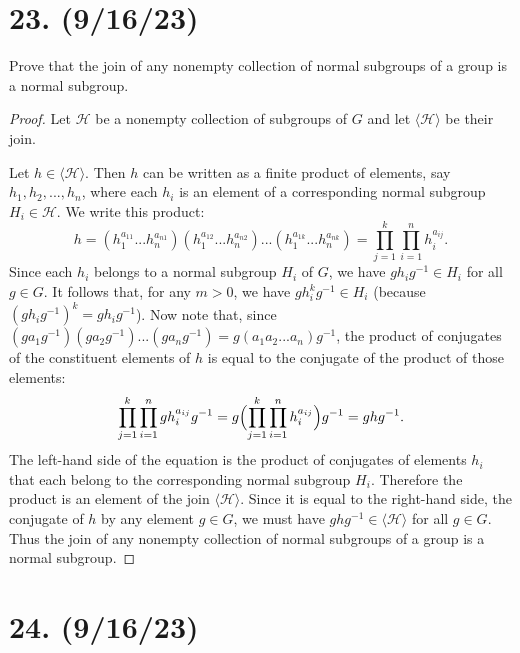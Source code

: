 \documentclass{article}
\begin{document}
\section*{23. (9/16/23)}

Prove that the join of any nonempty collection of normal subgroups of a group is a normal subgroup.

\begin{proof}
    Let $\mathcal{H}$ be a nonempty collection of subgroups of $G$ and let $\langle \mathcal{H} \rangle$ be their join.

    Let $h \in \langle \mathcal{H} \rangle$. Then $h$ can be written as a finite product of elements, say $h_1, h_2, ..., h_n$, where each $h_i$ is an element of a corresponding normal subgroup $H_i \in \mathcal{H}$. We write this product:
    \begin{equation*}
        h = (h_1^{a_{11}}...h_n^{a_{n1}})(h_1^{a_{12}}...h_n^{a_{n2}})...(h_1^{a_{1k}}...h_n^{a_{nk}}) = \prod_{j = 1}^{k} \prod_{i = 1}^{n} h_i^{a_{ij}}.
    \end{equation*}
    Since each $h_i$ belongs to a normal subgroup $H_i$ of $G$, we have $gh_ig^{-1} \in H_i$ for all $g \in G$. It follows that, for any $m > 0$, we have $gh_i^kg^{-1} \in H_i$ (because $(gh_ig^{-1})^k = gh_ig^{-1}$). Now note that, since $(ga_1g^{-1})(ga_2g^{-1})...(ga_ng^{-1}) = g(a_1 a_2 ... a_n)g^{-1}$, the product of conjugates of the constituent elements of $h$ is equal to the conjugate of the product of those elements:
    \begin{equation*}
        \prod_{j = 1}^{k} \prod_{i = 1}^{n} gh_i^{a_{ij}}g^{-1} = g \Bigl(\prod_{j = 1}^{k} \prod_{i = 1}^{n} h_i^{a_{ij}}\Bigr) g^{-1} = ghg^{-1}.
    \end{equation*}
    The left-hand side of the equation is the product of conjugates of elements $h_i$ that each belong to the corresponding normal subgroup $H_i$. Therefore the product is an element of the join $\langle \mathcal{H} \rangle$. Since it is equal to the right-hand side, the conjugate of $h$ by any element $g \in G$, we must have $ghg^{-1} \in \langle \mathcal{H} \rangle$ for all $g \in G$. Thus the join of any nonempty collection of normal subgroups of a group is a normal subgroup.
\end{proof}

\section*{24. (9/16/23)}
\end{document}
